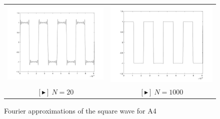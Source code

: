 \begin{figure}[h]
\begin{tabular}{cc}
        \includegraphics[scale=.18]{square_approx_20.png} & \includegraphics[scale=.18]{square_approx_1000.png}\\
        \href{https://drive.google.com/file/d/1Ke-h2uAj-fsGQuUQHSVxi4EvBqJfqqQg/view?usp=sharing}{\color{blue} $[\blacktriangleright]~N = 20$} & \href{https://drive.google.com/file/d/1kIVK22Os_Ny55Rpco6gKy--HNduItWO8/view?usp=sharing}{\color{blue}$[\blacktriangleright]~N = 1000$}\\
        
    \end{tabular}
    \caption{Fourier approximations of the square wave for A4}
    \label{fig:square_approx}
\end{figure}

